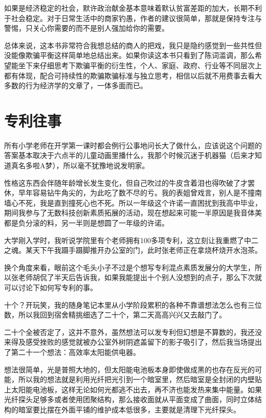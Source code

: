 \documentclass[]{book}
\begin{document}
如果是经济稳定的社会，默许政治献金基本意味着默认贫富差距的加大，长期不利于社会稳定。对于日常生活中的商家钓愚，作者的建议很简单，那就是保持专注与警惕，只关心你需要的而不是别人强加给你的需要。

总体来说，这本书非常符合我想总结的商人的把戏，我只是隐约感觉到一些共性但没能像欺骗平衡这样简单地总结出来。如果你读这本书只看到了陈词滥调，那么希望能坐下来仔细思考下欺骗平衡的衍生性，个人、家庭、政府、行业等不同层次上都有体现，配合可持续性的欺骗欺骗标准与独立思考，相信以后就不用费事去看大多数的行为经济学的文章了，一体多面而已。

\hypertarget{ux4e13ux5229ux5f80ux4e8b}{%
\section{专利往事}\label{ux4e13ux5229ux5f80ux4e8b}}

所有小学老师在开学第一课时都会例行公事地问长大了做什么，应该说这个问题的答案基本取决于六点半的儿童动画里播什么，我那个时候沉迷于机器猫（后来才知道真名多啦A梦），所以毫不犹豫地说发明家。

性格这东西会伴随年龄增长发生变化，但自己吹过的牛皮含着泪也得吹破了才罢休，早年容易钻牛角尖的，为此吃了数不尽的亏。我的表姐曾戏言，别人是不撞南墙心不死，我是直到撞死心也不死。所以一年级这个许诺一直困扰到我高中毕业，期间我参与了无数科技创新素质拓展的活动，现在想起来可能一半原因是我音体美都是负分滚的料，另一半则是想圆了一年级的许诺。

大学刚入学时，我听说学院里有个老师拥有100多项专利，这立刻让我重燃了中二之魂。某天下午我蹑手蹑脚推开办公室的门，此时张老师正在拿烧杯烧开水泡茶。

换个角度来看，眼前这个毛头小子不过是个想写专利混点素质发展分的大学生，所以张老师胡侃了半天后告诉我，如果我能提出十个别人没想到的点子，那么下次就可以讨论下如何写专利的事。

十个？开玩笑，我的随身笔记本里从小学阶段累积的各种不靠谱想法怎么也有三位数，所以我回到宿舍精挑细选了二十个，第二天高高兴兴又去敲门了。

二十个全被否定了，这并不意外，虽然想法可以发专利但幻想是不算数的，我还没来得及感受挫败的感觉就被办公室外树阴遮盖留下的影子吸引了，然后我当场提出了第二十一个想法：高效率太阳能供电器。

想法很简单，光是普照大地的，但太阳能电池板本身即使做成黑的也存在反光的可能，所以我的想法就是利用光纤把光引到一个暗室里，然后暗室是全封闭的内壁贴上太阳能电池板，这样无论如何光都逃不出去，再不济也能发热来集中能量。如果光纤探头足够多或者使用团聚结构，那么接收面就从平面变成了曲面，同时立体结构的暗室要比摆在外面平铺的维护成本低很多，主要就是清理下光纤探头。
\end{document}

